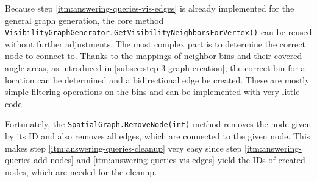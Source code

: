	Because step \ref{itm:answering-queries-vis-edges} is already implemented for the general graph generation, the core method \texttt{VisibilityGraphGenerator.GetVisibilityNeighborsForVertex()} can be reused without further adjustments.
	The most complex part is to determine the correct node to connect to.
	Thanks to the mappings of neighbor bins and their covered angle areas, as introduced in \cref{subsec:step-3-graph-creation}, the correct bin for a location can be determined and a bidirectional edge be created.
	These are mostly simple filtering operations on the bins and can be implemented with very little code.
	
	Fortunately, the \texttt{SpatialGraph.RemoveNode(int)} method removes the node given by its ID and also removes all edges, which are connected to the given node.
	This makes step \ref{itm:answering-queries-cleanup} very easy since step \ref{itm:answering-queries-add-nodes} and \ref{itm:answering-queries-vis-edges} yield the IDs of created nodes, which are needed for the cleanup.